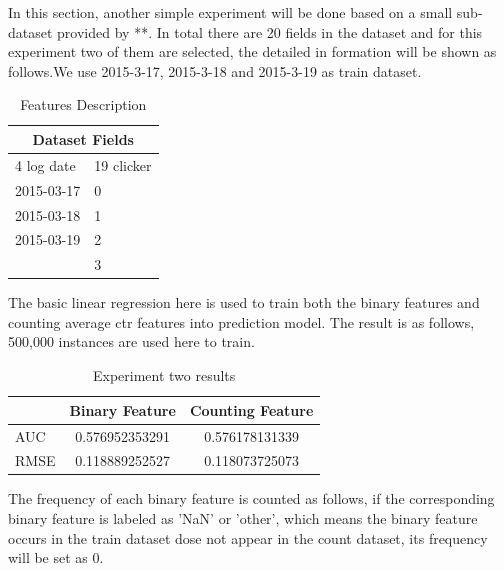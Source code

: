 \documentclass{article}
\begin{document}
In this section, another simple experiment will be done based on a small sub-dataset provided by **. In total there are 20 fields in the dataset and for this experiment two of them are selected, the detailed in formation will be shown as follows.We use 2015-3-17, 2015-3-18 and 2015-3-19 as train dataset. \vspace{3mm}
\begin{table}[h]
\setlength{\parindent}{17ex}
\begin{tabular}{ |p{3cm}||p{3cm}|  }
 \hline
 \multicolumn{2}{|c|}{Dataset Fields} \\
 \hline
  4 log date  & 19 clicker\\
 \hline
      2015-03-17   &0\\
   2015-03-18  & 1  \\
   2015-03-19 & 2\\
    & 3\\
 \hline
\end{tabular}
\caption{Features Description}
\label{tab:tri}
\end{table}\vspace{3mm}

 The basic linear regression here is used to train both the binary features and counting average ctr features into prediction model. The result is as follows, 500,000 instances are used here to train.

\begin{table}[h]
\setlength{\parindent}{17ex}
\begin{tabular}{l | c | c }
  & Binary Feature & Counting Feature\\
\hline \hline
AUC & 0.576952353291
 & 0.576178131339 \\
 
RMSE & 0.118889252527 & 0.118073725073


\end{tabular}
\caption{Experiment two results}
\label{tab:tri}
\end{table}
The frequency of each binary feature is counted as follows, if the corresponding binary feature is labeled as 'NaN' or 'other', which means the binary feature occurs in the train dataset dose not appear in the count dataset, its frequency will be set as 0. \vspace{3mm}
\end{document}
